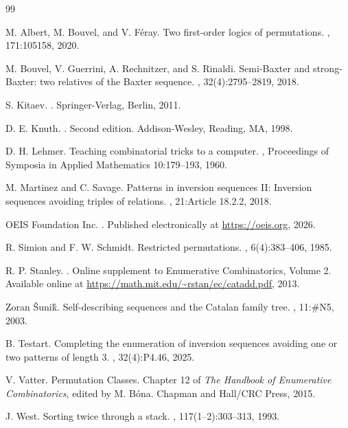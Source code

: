 \documentclass[11pt]{article}
\theoremstyle{remark}
\theoremstyle{definition}
\begin{document}
\begin{thebibliography}{99}

M. Albert, M. Bouvel, and V. Féray.
\newblock Two first-order logics of permutations.
, 171:105158, 2020.

M. Bouvel, V. Guerrini, A. Rechnitzer, and S. Rinaldi.
\newblock Semi-Baxter and strong-Baxter: two relatives of the Baxter sequence.
, 32(4):2795--2819, 2018.

S. Kitaev.
.
\newblock Springer-Verlag, Berlin, 2011.

D. E. Knuth.
.
\newblock Second edition. Addison-Wesley, Reading, MA, 1998.

D. H. Lehmer.
\newblock Teaching combinatorial tricks to a computer.
, Proceedings of Symposia in Applied Mathematics 10:179--193, 1960.

M. Martinez and C. Savage.
\newblock Patterns in inversion sequences {II}: Inversion sequences avoiding triples of relations.
, 21:Article 18.2.2, 2018.

OEIS Foundation Inc.
. 
\newblock Published electronically at \url{https://oeis.org}, 2026.

R. Simion and F. W. Schmidt.
\newblock Restricted permutations.
, 6(4):383--406, 1985.

R. P. Stanley.
.
\newblock Online supplement to Enumerative Combinatorics, Volume 2. Available online at \url{https://math.mit.edu/~rstan/ec/catadd.pdf}, 2013.

Zoran \v Suni\'k.
\newblock Self-describing sequences and the Catalan family tree.
, 11:\#N5, 2003.

B. Testart.
\newblock Completing the enumeration of inversion sequences avoiding one or two patterns of length 3.
, 32(4):P4.46, 2025.

V. Vatter.
\newblock Permutation Classes.
\newblock Chapter 12 of {\em The Handbook of Enumerative Combinatorics}, edited by M. B\'ona. Chapman and Hall/CRC Press, 2015.

J. West.
\newblock Sorting twice through a stack.
, 117(1--2):303--313, 1993.

\end{thebibliography}
\end{document}
